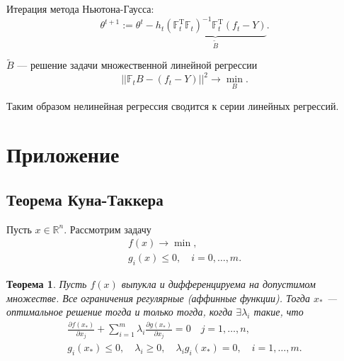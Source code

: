 \documentclass[11pt,colorlinks=true]{article}
\DeclareMathOperator{\T}{T}
\newtheorem{theorem}{Теорема}
\begin{document}
Итерация метода Ньютона-Гаусса:
\begin{equation*}
\theta^{t+1}:=
\theta^{t}
-
h_{t}\underbrace{(\mathbb{F}_{t}^{\T}\mathbb{F}_{t})^{-1}\mathbb{F}_{t}^{\T}(f_{t}-Y)}_{\widetilde{B}}.
\end{equation*}

$\widetilde{B}$ --- решение задачи множественной линейной регрессии
\begin{equation*}
||\mathbb{F}_{t}B-(f_{t}-Y)||^{2}
\to
\min_{B}.
\end{equation*}

Таким образом нелинейная регрессия сводится к серии линейных регрессий.

\section{Приложение}
\subsection{Теорема Куна-Таккера}

Пусть $x\in\mathbb{R}^{n}$. Рассмотрим задачу 
\begin{gather*}
f(x)\to\min,\\
g_{i}(x)\leq 0,
\quad
i=0,\ldots,m.
\end{gather*}

\begin{theorem}\label{th:CT}
Пусть $f(x)$ выпукла и дифференцируема на допустимом множестве. Все ограничения регулярные (аффинные функции).
Тогда $x_{\ast}$ --- оптимальное решение тогда и только тогда, когда $\exists\lambda_{i}$ такие, что 
\begin{gather*}
\frac{\partial f(x_{\ast})}{\partial x_{j}}
+
\sum_{i=1}^{m}\lambda_{i}\frac{\partial g(x_{\ast})}{\partial x_{j}}=0
\quad
j=1,\ldots,n,\\
g_{i}(x_{\ast})\leq 0,\quad
\lambda_{i}\geq 0,
\quad
\lambda_{i}g_{i}(x_{\ast})=0,
\quad
i=1,\ldots,m.
\end{gather*}
\end{theorem}
\end{document}
